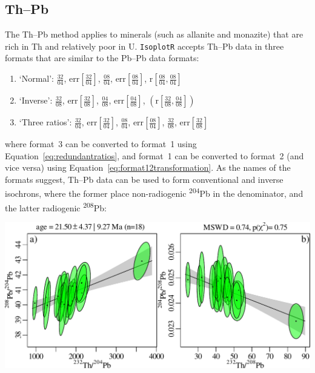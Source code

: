 \begin{refsection}
\section{Th--Pb}\label{sec:ThPb}

The Th--Pb method applies to minerals (such as allanite and monazite)
that are rich in Th and relatively poor in U. \texttt{IsoplotR}
accepts Th--Pb data in three formats that are similar to the Pb--Pb
data formats:

\begin{enumerate}
\item{`Normal':}
  $\frac{32}{04}$,  
  $\mbox{err}\!\left[\frac{32}{04}\right]$, 
  $\frac{08}{04}$,  
  $\mbox{err}\!\left[\frac{08}{04}\right]$,  
  $\mbox{r}\!\left[\frac{08}{04},\frac{08}{04}\right]$
\item{`Inverse':}
  $\frac{32}{08}$,  
  $\mbox{err}\!\left[\frac{32}{08}\right]$, 
  $\frac{04}{08}$,  
  $\mbox{err}\!\left[\frac{04}{08}\right]$, 
  $\left(\mbox{r}\!\left[\frac{32}{08},\frac{04}{08}\right]\right)$
\item{`Three ratios':}
  $\frac{32}{04}$,  
  $\mbox{err}\!\left[\frac{32}{04}\right]$, 
  $\frac{08}{04}$,  
  $\mbox{err}\!\left[\frac{08}{04}\right]$,  
  $\frac{32}{08}$,  
  $\mbox{err}\!\left[\frac{32}{08}\right]$
\end{enumerate}

\noindent where format~3 can be converted to format~1 using
Equation~\ref{eq:redundantratios}, and format~1 can be converted to
format~2 (and vice versa) using
Equation~\ref{eq:format12transformation}. As the names of the formats
suggest, Th--Pb data can be used to form conventional and inverse
isochrons, where the former place non-radiogenic
\textsuperscript{204}Pb in the denominator, and the latter radiogenic
\textsuperscript{208}Pb:

\noindent\begin{minipage}[t][][b]{.7\linewidth}
\includegraphics[width=\textwidth]{../figures/ThPb.pdf}
\end{minipage}
\begin{minipage}[t][][t]{.3\linewidth}
\end{minipage}


\end{refsection}
